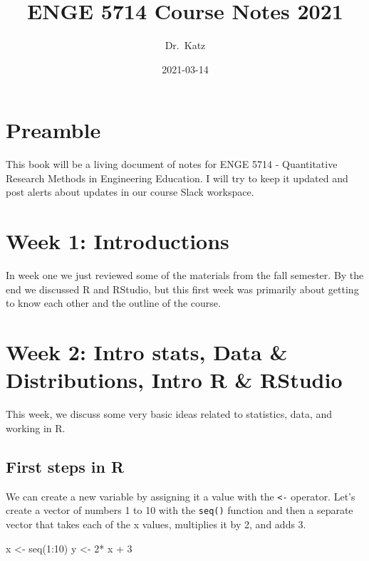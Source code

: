 \documentclass[
]{book}
\title{ENGE 5714 Course Notes 2021}
\author{Dr.~Katz}
\date{2021-03-14}
\newenvironment{Shaded}{\begin{snugshade}}{\end{snugshade}}
\newcommand{\DecValTok}[1]{\textcolor[rgb]{0.00,0.00,0.81}{#1}}
\newcommand{\FunctionTok}[1]{\textcolor[rgb]{0.00,0.00,0.00}{#1}}
\newcommand{\NormalTok}[1]{#1}
\newcommand{\OtherTok}[1]{\textcolor[rgb]{0.56,0.35,0.01}{#1}}
\newcommand{\SpecialCharTok}[1]{\textcolor[rgb]{0.00,0.00,0.00}{#1}}
\begin{document}
\maketitle

{
\setcounter{tocdepth}{1}
\tableofcontents
}
\hypertarget{preamble}{%
\chapter*{Preamble}\label{preamble}}

This book will be a living document of notes for ENGE 5714 - Quantitative Research Methods in Engineering Education. I will try to keep it updated and post alerts about updates in our course Slack workspace.

\hypertarget{week-1-introductions}{%
\chapter{Week 1: Introductions}\label{week-1-introductions}}

In week one we just reviewed some of the materials from the fall semester. By the end we discussed R and RStudio, but this first week was primarily about getting to know each other and the outline of the course.

\hypertarget{week-2-intro-stats-data-distributions-intro-r-rstudio}{%
\chapter{Week 2: Intro stats, Data \& Distributions, Intro R \& RStudio}\label{week-2-intro-stats-data-distributions-intro-r-rstudio}}

This week, we discuss some very basic ideas related to statistics, data, and working in R.

\hypertarget{first-steps-in-r}{%
\section{First steps in R}\label{first-steps-in-r}}

We can create a new variable by assigning it a value with the \texttt{\textless{}-} operator. Let's create a vector of numbers 1 to 10 with the \texttt{seq()} function and then a separate vector that takes each of the x values, multiplies it by 2, and adds 3.

\begin{Shaded}
\begin{Highlighting}[]
\NormalTok{x }\OtherTok{\textless{}{-}} \FunctionTok{seq}\NormalTok{(}\DecValTok{1}\SpecialCharTok{:}\DecValTok{10}\NormalTok{)}
\NormalTok{y }\OtherTok{\textless{}{-}} \DecValTok{2}\SpecialCharTok{*}\NormalTok{ x }\SpecialCharTok{+} \DecValTok{3}
\end{Highlighting}
\end{Shaded}
\end{document}
